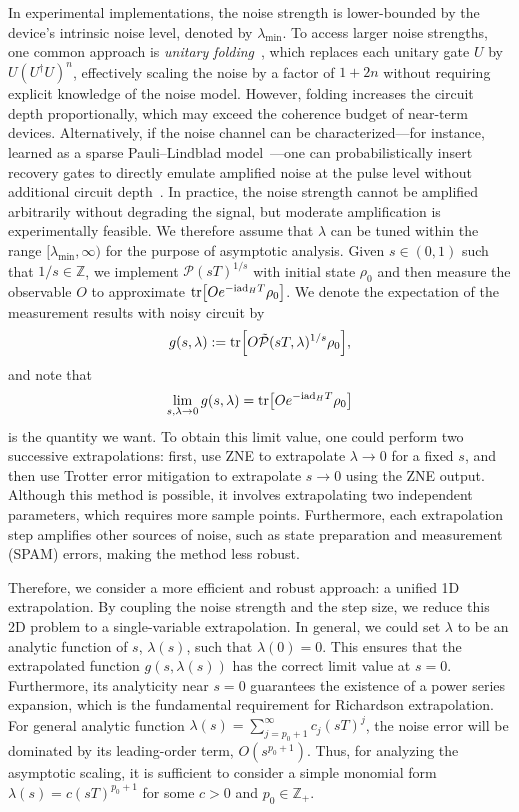 \documentclass[11pt]{article}
\renewcommand{\i}{\mathrm{i}}
\newcommand{\ad}{\mathrm{ad}}
\newcommand{\mc}{\mathcal}
\newcommand{\mb}{\mathbb}
\begin{document}
In experimental implementations, the noise strength is lower-bounded by the device's intrinsic noise level, denoted by $\lambda_{\min}$. To access larger noise strengths, one common approach is \textit{unitary folding}~\cite{giurgica-tiron_digital_2020}, which replaces each unitary gate $U$ by $U(U^\dagger U)^n$, effectively scaling the noise by a factor of $1+2n$ without requiring explicit knowledge of the noise model. However, folding increases the circuit depth proportionally, which may exceed the coherence budget of near-term devices.
Alternatively, if the noise channel can be characterized---for instance, learned as a sparse Pauli--Lindblad model~\cite{berg_probabilistic_2023}---one can probabilistically insert recovery gates to directly emulate amplified noise at the pulse level without additional circuit depth~\cite{li2017efficient}. In practice, the noise strength cannot be amplified arbitrarily without degrading the signal, but moderate amplification is experimentally feasible. We therefore assume that $\lambda$ can be tuned within the range $[\lambda_{\min}, \infty)$ for the purpose of asymptotic analysis.
Given $s\in (0,1)$ such that $1/s\in \mathbb{Z}$, we implement $\mc P(sT)^{1/s}$ with initial state $\rho_0$ and then measure the observable $O$ to approximate $\tr[Oe^{-\i \ad_H T}\rho_0]$. We denote the expectation of the measurement results with noisy circuit by  \begin{align*}
    g(s,\lambda) := \tr[O\tilde{\mc P}(sT,\lambda)^{1/s}\rho_0],
\end{align*}
and note that \begin{align*}
    \lim_{s,\lambda\to 0} g(s,\lambda) = \tr[Oe^{-\i \ad_H T}\rho_0]
\end{align*}
is the quantity we want. To obtain this limit value, one could perform two successive extrapolations: first, use ZNE to extrapolate $\lambda \to 0$ for a fixed $s$, and then use Trotter error mitigation \cite{watson2025exponentially} to extrapolate $s \to 0$ using the ZNE output. Although this method is possible, it involves extrapolating two independent parameters, which requires more sample points. Furthermore, each extrapolation step amplifies other sources of noise, such as state preparation and measurement (SPAM) errors, making the method less robust.

Therefore, we consider a more efficient and robust approach: a unified 1D extrapolation. By coupling the noise strength and the step size, we reduce this 2D problem to a single-variable extrapolation. In general, we could set $\lambda$ to be an analytic function of $s$, $\lambda(s)$, such that $\lambda(0)=0$. This ensures that the extrapolated function $g(s,\lambda(s))$ has the correct limit value at $s = 0$. Furthermore, its analyticity near $s=0$ guarantees the existence of a power series expansion, which is the fundamental requirement for Richardson extrapolation. For general analytic function $\lambda(s) =\sum_{j=p_0+1}^{\infty} c_j (sT)^j$, the noise error will be dominated by its leading-order term, $O(s^{p_0+1})$. Thus, for analyzing the asymptotic scaling, it is sufficient to consider a simple monomial form  $\lambda(s) = c(sT)^{p_0+1}$ for some $c>0$ and $p_0\in \mb{Z}_+$.
\end{document}
